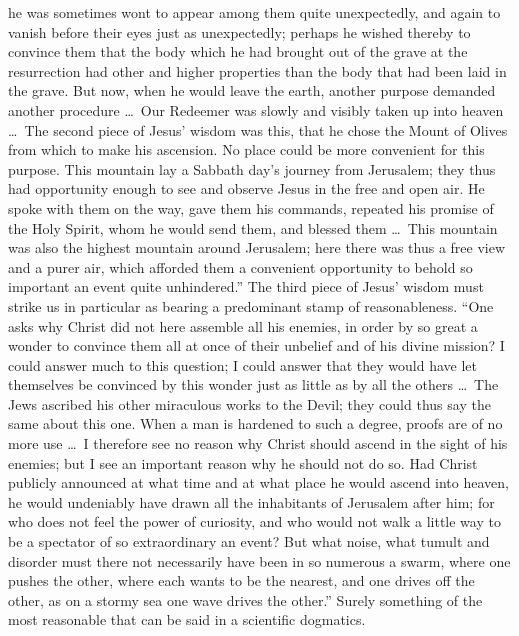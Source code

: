 \documentclass[12pt,a4paper]{article}
\newcommand{\opage}[1]{\marginnote{\footnotesize\textit{[#1]}}}
\begin{document}
he was sometimes wont to appear among them quite unexpectedly, and again to
vanish before their eyes just as unexpectedly; perhaps he wished thereby to
convince them that the body which he had brought out of the grave at the
resurrection had other and higher properties than the body that had been
laid in the grave. But now, when he would leave the earth, another purpose
demanded another procedure \ldots\ Our Redeemer was slowly and visibly
taken up into heaven \ldots\ The
\opage{29}second piece of Jesus' wisdom was this, that he chose the Mount of Olives
from which to make his ascension. No place could be more convenient for this
purpose. This mountain lay a Sabbath day's journey from Jerusalem; they thus
had opportunity enough to see and observe Jesus in the free and open air. He
spoke with them on the way, gave them his commands, repeated his promise of
the Holy Spirit, whom he would send them, and blessed them \ldots\ This
mountain was also the highest mountain around Jerusalem; here there was thus
a free view and a purer air, which afforded them a convenient opportunity to
behold so important an event quite unhindered.'' The third piece of Jesus'
wisdom must strike us in particular as bearing a predominant stamp of
reasonableness. ``One asks why Christ did not here assemble all his enemies,
in order by so great a wonder to convince them all at once of their unbelief
and of his divine mission? I could answer much to this question; I could
answer that they would have let themselves be convinced by this wonder just
as little as by all the others \ldots\ The Jews ascribed his other miraculous
works to the Devil; they could thus say the same about this one. When a man
is hardened to such a degree, proofs are of no more use \ldots\ I therefore
see no reason why Christ should ascend in the sight of his enemies; but I see
an important reason why he should not do so. Had Christ publicly announced
at what time and at what place he would ascend into heaven, he would
undeniably have drawn all the inhabitants of Jerusalem after him; for who
does not feel the power of curiosity, and who would not walk a little way to
be a spectator of so extraordinary an event? But what noise, what tumult and
disorder must there not necessarily have been in so numerous a swarm, where
one pushes the other, where each wants to be the nearest, and one drives off
the other, as on a stormy sea one wave drives the other.'' Surely something
of the most reasonable that can be said in a scientific dogmatics.
\end{document}
